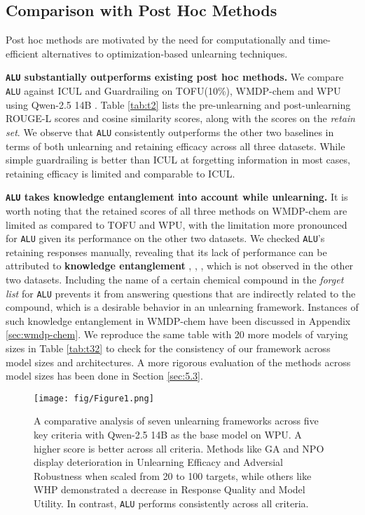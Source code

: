 \subsection{Comparison with Post Hoc Methods}
\label{sec:5.2}
Post hoc methods are motivated by the need for computationally and time-efficient alternatives to optimization-based unlearning techniques. 

\textbf{\texttt{ALU} substantially outperforms existing post hoc methods.} We compare \texttt{ALU} against ICUL \cite{pawelczyk2023context} and Guardrailing \cite{thaker2024guardrail} on TOFU(10\%), WMDP-chem \cite{li2024wmdpbenchmarkmeasuringreducing} and WPU \cite{liu2024revisitingwhosharrypotter} using Qwen-2.5 14B \cite{qwen2.5}. Table \ref{tab:t2} lists the pre-unlearning and post-unlearning ROUGE-L scores and cosine similarity scores, along with the scores on the \emph{retain set}. We observe that \texttt{ALU} consistently outperforms the other two baselines in terms of both unlearning and retaining efficacy across all three datasets. While simple guardrailing is better than ICUL at forgetting information in most cases, retaining efficacy is limited and comparable to ICUL.

\textbf{\texttt{ALU} takes knowledge entanglement into account while unlearning.} It is worth noting that the retained scores of all three methods on WMDP-chem are limited as compared to TOFU and WPU, with the limitation more pronounced for \texttt{ALU} given its performance on the other two datasets. We checked \texttt{ALU}'s retaining responses manually, revealing that its lack of performance can be attributed to \textbf{knowledge entanglement} \cite{MCCLOSKEY1989109}, \cite{liu2024largelanguagemodelunlearning}, \cite{maini2024tofu}, which is not observed in the other two datasets. Including the name of a certain chemical compound in the \emph{forget list} for \texttt{ALU} prevents it from answering questions that are indirectly related to the compound, which is a desirable behavior in an unlearning framework. Instances of such knowledge entanglement in WMDP-chem have been discussed in Appendix \ref{sec:wmdp-chem}. We reproduce the same table with 20 more models of varying sizes in Table \ref{tab:t32} to check for the consistency of our framework across model sizes and architectures. A more rigorous evaluation of the methods across model sizes has been done in Section \ref{sec:5.3}.



\begin{figure*}[t]
     \centering
     \texttt{[image: fig/Figure1.png]}
     \caption{A comparative analysis of seven unlearning frameworks across five key criteria with Qwen-2.5 14B as the base model on WPU. A higher score is better across all criteria. Methods like GA and NPO display deterioration in Unlearning Efficacy and Adversial Robustness when scaled from 20 to 100 targets, while others like WHP demonstrated a decrease in Response Quality and Model Utility. In contrast, \texttt{ALU} performs consistently across all criteria.}
     \label{fig:f1}
     \vspace{-1\baselineskip}
\end{figure*}

